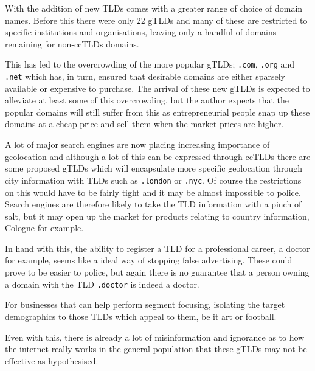\documentclass[11pt, a4paper]{article}
\begin{document}
With the addition of new \glspl{TLD} comes with a greater range of choice of
domain names. Before this there were only 22 \glspl{gTLD} and many of these are
restricted to specific institutions and organisations, leaving only a handful 
of domains remaining for non-\glspl{ccTLD} domains.

This has led to the overcrowding of the more popular \glspl{gTLD}; \texttt{.com},
\texttt{.org} and \texttt{.net} which has, in turn, ensured that desirable 
domains are either sparsely available or expensive to purchase. The arrival of
these new \glspl{gTLD} is expected to alleviate at least some of this 
overcrowding, but the author expects that the popular domains will still suffer
from this as entrepreneurial people snap up these domains at a cheap price and
sell them when the market prices are higher.

A lot of major search engines are now placing increasing importance of 
geolocation\cite{linkdex2012georanking} and although a lot of this can be
expressed through \glspl{ccTLD} there are some proposed \glspl{gTLD} which
will encapsulate more specific geolocation through city information with 
\glspl{TLD} such as \texttt{.london} or \texttt{.nyc}. Of course the 
restrictions on this would have to be fairly tight and it may be almost 
impossible to police. Search engines are therefore likely to take the
\gls{TLD} information with a pinch of salt, but it may open up the market for
products relating to country information, Cologne for example.

In hand with this, the ability to register a \gls{TLD} for a professional
career, a doctor for example, seems like a ideal way of stopping false 
advertising. These could prove to be easier to police, but again there is no
guarantee that a person owning a domain with the \gls{TLD} \texttt{.doctor} is
indeed a doctor.

For businesses that can help perform segment focusing, isolating the target
demographics to those \glspl{TLD} which appeal to them, be it art or football.

Even with this, there is already a lot of misinformation and ignorance as to
how the internet really works in the general population that these \glspl{gTLD}
may not be effective as hypothesised.

\end{document}
